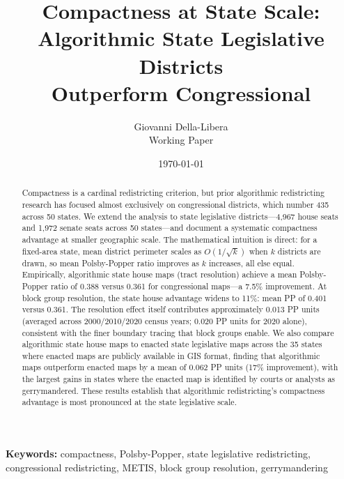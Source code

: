 \documentclass[12pt]{article}
\title{Compactness at State Scale:\\
Algorithmic State Legislative Districts\\
Outperform Congressional}
\author{
Giovanni Della-Libera\\
\small{Working Paper}
}
\date{\today}
\begin{document}
\maketitle

\begin{abstract}
Compactness is a cardinal redistricting criterion, but prior algorithmic redistricting research has focused almost exclusively on congressional districts, which number 435 across 50 states. We extend the analysis to state legislative districts---4,967 house seats and 1,972 senate seats across 50 states---and document a systematic compactness advantage at smaller geographic scale. The mathematical intuition is direct: for a fixed-area state, mean district perimeter scales as $O(1/\sqrt{k})$ when $k$ districts are drawn, so mean Polsby-Popper ratio improves as $k$ increases, all else equal. Empirically, algorithmic state house maps (tract resolution) achieve a mean Polsby-Popper ratio of 0.388 versus 0.361 for congressional maps---a 7.5\% improvement. At block group resolution, the state house advantage widens to 11\%: mean PP of 0.401 versus 0.361. The resolution effect itself contributes approximately 0.013 PP units (averaged across 2000/2010/2020 census years; 0.020 PP units for 2020 alone), consistent with the finer boundary tracing that block groups enable. We also compare algorithmic state house maps to enacted state legislative maps across the 35 states where enacted maps are publicly available in GIS format, finding that algorithmic maps outperform enacted maps by a mean of 0.062 PP units (17\% improvement), with the largest gains in states where the enacted map is identified by courts or analysts as gerrymandered. These results establish that algorithmic redistricting's compactness advantage is most pronounced at the state legislative scale.
\end{abstract}

\noindent\textbf{Keywords:} compactness, Polsby-Popper, state legislative redistricting, congressional redistricting, METIS, block group resolution, gerrymandering










\end{document}
